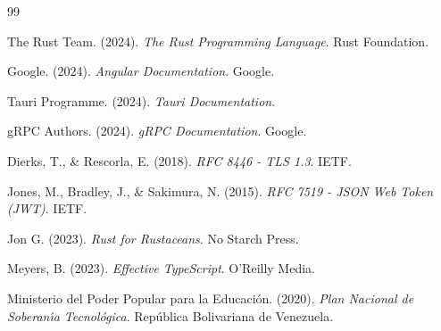 \begin{thebibliography}{99}
\item The Rust Team. (2024). \textit{The Rust Programming Language}. Rust Foundation.

\item Google. (2024). \textit{Angular Documentation}. Google.

\item Tauri Programme. (2024). \textit{Tauri Documentation}.

\item gRPC Authors. (2024). \textit{gRPC Documentation}. Google.

\item Dierks, T., \& Rescorla, E. (2018). \textit{RFC 8446 - TLS 1.3}. IETF.

\item Jones, M., Bradley, J., \& Sakimura, N. (2015). \textit{RFC 7519 - JSON Web Token (JWT)}. IETF.

\item Jon G. (2023). \textit{Rust for Rustaceans}. No Starch Press.

\item Meyers, B. (2023). \textit{Effective TypeScript}. O'Reilly Media.

\item Ministerio del Poder Popular para la Educaci\'on. (2020). \textit{Plan Nacional de Soberan\'{\i}a Tecnol\'ogica}. Rep\'ublica Bolivariana de Venezuela.

\end{thebibliography}

\newpage
